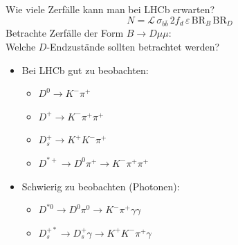\documentclass[compress,aspectratio=43]{beamer}
\begin{document}
%

\begin{frame}{Wie viele Zerfälle kann man bei LHCb erwarten?}
  \begin{equation*}
    N = \mathcal{L}\,\sigma_{b\overline{b}}\,2 f_d\,ε\,\text{BR}_B\,\text{BR}_D
  \end{equation*}
  Betrachte Zerfälle der Form $B\to D\mu\mu$:\\
  Welche $D$-Endzustände sollten betrachtet werden?
  \begin{itemize}
    \item Bei LHCb gut zu beobachten:
      \begin{itemize}
        \item $D^{0}\to K^-\pi^+$
        \item $D^+\to K^-\pi^+\pi^+$
        \item $D_s^+\to K^+K^-\pi^+$
        \item $D^{*+} \to D^0\pi^+ \to K^-\pi^+\pi^+$
      \end{itemize}
    \item Schwierig zu beobachten (Photonen):
      \begin{itemize}
        \item $D^{*0} \to D^0\pi^0 \to K^-\pi^+\gamma\gamma$
        \item $D_s^{+*}\to D_s^+\gamma \to K^+K^-\pi^+\gamma$
      \end{itemize}
  \end{itemize}
\end{frame}
\end{document}
